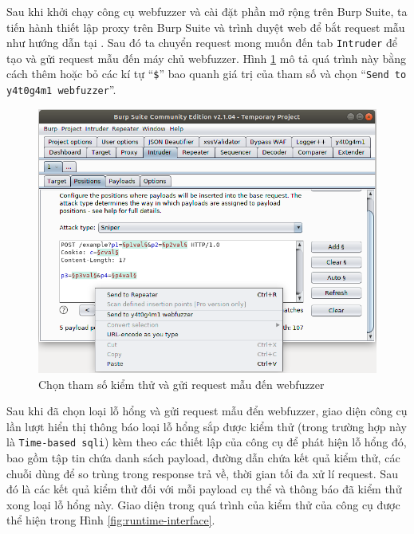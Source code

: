 Sau khi khởi chạy công cụ webfuzzer và cài đặt phần mở rộng trên Burp Suite, ta tiến hành thiết lập proxy trên Burp Suite và trình duyệt web để bắt request mẫu như hướng dẫn tại \parencite{burp-suite-proxy}. Sau đó ta chuyển request mong muốn đến tab \texttt{Intruder} để tạo và gửi request mẫu đến máy chủ webfuzzer. Hình \ref{fig:send-base-request-1} mô tả quá trình này bằng cách thêm hoặc bỏ các kí tự ``\texttt{\$}'' bao quanh giá trị của tham số và chọn ``\texttt{Send to y4t0g4m1 webfuzzer}''.
\begin{figure}[H]
  \centering
    \includegraphics[width=\textwidth,keepaspectratio=true]{images/send-base-request.png}
  \caption{Chọn tham số kiểm thử và gửi request mẫu đến webfuzzer}
  \label{fig:send-base-request-1}
\end{figure}
Sau khi đã chọn loại lỗ hổng và gửi request mẫu đển webfuzzer, giao diện công cụ lần lượt hiển thị thông báo loại lỗ hổng sắp được kiểm thử (trong trường hợp này là \texttt{Time-based \acrshort{sqli}}) kèm theo các thiết lập của công cụ để phát hiện lỗ hổng đó, bao gồm tập tin chứa danh sách payload, đường dẫn chứa kết quả kiểm thử, các chuỗi dùng để so trùng trong response trả về, thời gian tối đa xử lí request. Sau đó là các kết quả kiểm thử đối với mỗi payload cụ thể và thông báo đã kiểm thử xong loại lỗ hổng này. Giao diện trong quá trình của kiểm thử của công cụ được thể hiện trong Hình \ref{fig:runtime-interface}.
